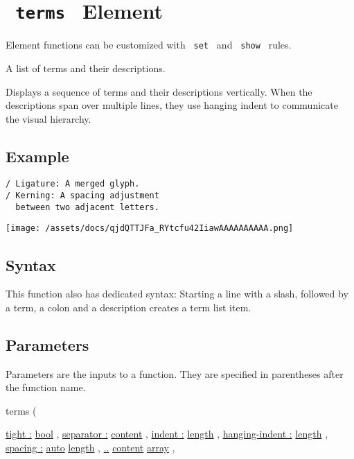 \section{\texorpdfstring{\texttt{\ terms\ } {{ Element
}}}{ terms   Element }}\label{summary}

\label{element-tooltip}
Element functions can be customized with \texttt{\ set\ } and
\texttt{\ show\ } rules.

A list of terms and their descriptions.

Displays a sequence of terms and their descriptions vertically. When the
descriptions span over multiple lines, they use hanging indent to
communicate the visual hierarchy.

\subsection{Example}\label{example}

\begin{verbatim}
/ Ligature: A merged glyph.
/ Kerning: A spacing adjustment
  between two adjacent letters.
\end{verbatim}

\texttt{[image: /assets/docs/qjdQTTJFa\_RYtcfu42IiawAAAAAAAAAA.png]}

\subsection{Syntax}\label{syntax}

This function also has dedicated syntax: Starting a line with a slash,
followed by a term, a colon and a description creates a term list item.

\subsection{\texorpdfstring{{ Parameters
}}{ Parameters }}\label{parameters}

\label{parameters-tooltip}
Parameters are the inputs to a function. They are specified in
parentheses after the function name.

{ terms } (

{ \hyperref[parameters-tight]{tight :}
\href{/docs/reference/foundations/bool/}{bool} , } {
\hyperref[parameters-separator]{separator :}
\href{/docs/reference/foundations/content/}{content} , } {
\hyperref[parameters-indent]{indent :}
\href{/docs/reference/layout/length/}{length} , } {
\hyperref[parameters-hanging-indent]{hanging-indent :}
\href{/docs/reference/layout/length/}{length} , } {
\hyperref[parameters-spacing]{spacing :}
\href{/docs/reference/foundations/auto/}{auto}
\href{/docs/reference/layout/length/}{length} , } {
\hyperref[parameters-children]{..}
\href{/docs/reference/foundations/content/}{content}
\href{/docs/reference/foundations/array/}{array} , }

